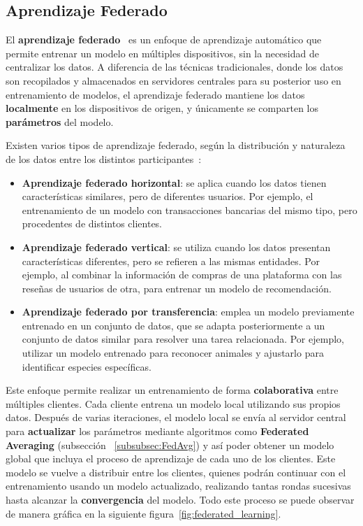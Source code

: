 \subsection{Aprendizaje Federado}
\label{subsec:AprendizajeFederado}
El \textbf{aprendizaje federado}~\cite{aprendizaje_federado_video} es un enfoque de aprendizaje automático que permite entrenar un modelo en múltiples dispositivos, sin la necesidad de centralizar los datos. A diferencia de las técnicas tradicionales, donde los datos son recopilados y almacenados en servidores centrales para su posterior uso en entrenamiento de modelos, el aprendizaje federado mantiene los datos \textbf{localmente} en los dispositivos de origen, y únicamente se comparten los \textbf{parámetros} del modelo.

Existen varios tipos de aprendizaje federado, según la distribución y naturaleza de los datos entre los distintos participantes~\cite{aprendizaje_federado_introduccion}:

\begin{itemize}
    \item \textbf{Aprendizaje federado horizontal}: se aplica cuando los datos tienen características similares, pero de diferentes usuarios. Por ejemplo, el entrenamiento de un modelo con transacciones bancarias del mismo tipo, pero procedentes de distintos clientes.
    
    \item \textbf{Aprendizaje federado vertical}: se utiliza cuando los datos presentan características diferentes, pero se refieren a las mismas entidades. Por ejemplo, al combinar la información de compras de una plataforma con las reseñas de usuarios de otra, para entrenar un modelo de recomendación.
    
    \item \textbf{Aprendizaje federado por transferencia}: emplea un modelo previamente entrenado en un conjunto de datos, que se adapta posteriormente a un conjunto de datos similar para resolver una tarea relacionada. Por ejemplo, utilizar un modelo entrenado para reconocer animales y ajustarlo para identificar especies específicas.
\end{itemize}

Este enfoque permite realizar un entrenamiento de forma \textbf{colaborativa} entre múltiples clientes. Cada cliente entrena un modelo local utilizando sus propios datos. Después de varias iteraciones, el modelo local se envía al servidor central para \textbf{actualizar} los parámetros mediante algoritmos como \textbf{Federated Averaging} (subsección ~\ref{subsubsec:FedAvg}) y así poder obtener un modelo global que incluya el proceso de aprendizaje de cada uno de los clientes. Este modelo se vuelve a distribuir entre los clientes, quienes podrán continuar con el entrenamiento usando un modelo actualizado, realizando tantas rondas sucesivas hasta alcanzar la \textbf{convergencia} del modelo. Todo este proceso se puede observar de manera gráfica en la siguiente figura~\ref{fig:federated_learning}.

